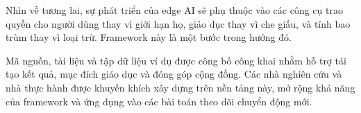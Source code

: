 Nhìn về tương lai, sự phát triển của edge AI sẽ phụ thuộc vào các công cụ trao quyền cho người dùng thay vì giới hạn họ, giáo dục thay vì che giấu, và tính bao trùm thay vì loại trừ. Framework này là một bước trong hướng đó.

Mã nguồn, tài liệu và tập dữ liệu ví dụ được công bố công khai nhằm hỗ trợ tái tạo kết quả, mục đích giáo dục và đóng góp cộng đồng. Các nhà nghiên cứu và nhà thực hành được khuyến khích xây dựng trên nền tảng này, mở rộng khả năng của framework và ứng dụng vào các bài toán theo dõi chuyển động mới.
